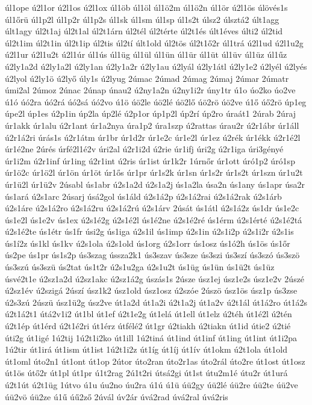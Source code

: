 {úl1ope
ú2l1or
ú2l1os
ú2l1ox
úl1öb
úl1öl
úl1ö2m
úl1ö2n
úl1ör
ú2l1ös
úlövés1s
úl1őrü
úl1p2l
úl1p2r
úl1p2s
úl1sk
úl1sm
úl1sp
úl1s2t
úlsz2
úlsztá2
últ1agg
últ1agy
úl2t1aj
úl2t1al
úl2t1árn
úl2tél
úl2térte
úl2t1és
últ1éves
últi2
úl2tid
úl2t1im
úl2t1in
úl2t1ip
úl2tis
úl2tí
últ1old
úl2tös
úl2t1ő2r
úl1trá
ú2l1ud
ú2l1u2g
ú2l1ur
ú2l1u2t
ú2l1úr
úl1ús
úl1üg
úl1ül
úl1ün
úl1ür
úl1üt
úl1üv
úl1üz
úl1űz
ú2ly1a2d
ú2ly1a2l
ú2ly1an
ú2ly1a2r
ú2ly1au
ú2lyál
ú2ly1átl
ú2ly1e2
ú2lyél
ú2lyés
ú2lyol
ú2ly1ö
ú2lyő
úly1s
ú2lyug
2úmac
2úmad
2úmag
2úmaj
2úmar
2úmatr
úmi2al
2úmoz
2únac
2únap
únau2
ú2ny1a2n
ú2ny1i2r
úny1tr
ú1o
úo2ko
úo2ve
ú1ó
úó2ra
úó2rá
úó2sá
úó2vo
ú1ö
úö2le
úö2lé
úö2lő
úö2rö
úö2ve
ú1ő
úő2rö
úp1eg
úpe2l
úp1es
ú2p1in
úp2la
úp2lé
ú2p1or
úp1p2l
úp2rí
úp2ro
úraát1
2úrab
2úraj
úr1akk
úr1alu
ú2r1ant
úr1a2nya
úra1p2
úra1szp
ú2rattas
úrau2r
ú2r1ábr
úr1áll
ú2r1á2ri
úrás1s
ú2r1átm
úr1br
úr1d2r
úr1e2c
úr1e2l
úr1ez
ú2rék
úr1ékk
ú2r1é2l
úr1é2ne
2úrés
úrfé2l1é2v
úri2al
ú2r1i2d
ú2rie
úr1ifj
úri2g
ú2r1iga
úri3gényé
úr1i2m
ú2r1inf
úr1ing
ú2r1int
ú2ris
úr1ist
úr1k2r
1úrnőr
úr1ott
úró1p2
úró1sp
úr1ö2c
úr1ö2l
úr1ön
úr1öt
úr1ős
úr1pr
úr1s2k
úr1sn
úr1s2r
úr1s2t
úr1szn
úr1u2t
úr1ü2l
úr1ü2v
2úsabl
ús1abr
ú2s1a2d
ú2s1a2j
ús1a2la
úsa2n
ús1any
ús1apr
úsa2r
ús1ará
ú2s1arc
2úsarj
úsá2gol
ús1áld
ú2s1á2p
ú2s1á2rai
ú2s1á2rak
ú2s1árb
ú2s1áre
ú2s1á2ro
ú2s1á2ru
ú2s1á2rú
ú2s1árv
2úsát
ús1átl
ú2s1á2z
ús1dr
ús1e2c
ús1e2l
ús1e2v
ús1ex
ú2s1é2g
ú2s1é2l
ús1é2ne
ú2s1é2ré
ús1érm
ú2s1érté
ú2s1é2tá
ú2s1é2te
ús1étr
ús1fr
úsi2g
ús1iga
ú2s1il
ús1imp
ú2s1in
ú2s1i2p
ú2s1i2r
ú2s1is
ús1í2z
ús1kl
ús1kv
ú2s1ola
ú2s1old
ús1org
ú2s1orr
ús1osz
ús1ó2h
ús1ös
ús1őr
ús2pe
ús1pr
ús1s2p
ús3szag
ússza2k1
ús3szav
ús3sze
ús3szi
ús3szí
ús3szó
ús3szö
ús3szú
ús3szü
ús2tat
ús1t2r
ú2s1u2ga
ú2s1u2t
ús1üg
ús1ün
ús1ü2t
ús1üz
úsvé2t1e
ú2sz1a2d
ú2sz1akc
ú2sz1á2g
úszás1s
2úsze
úsz1ej
úsz1e2s
úsz1e2v
2úszé
ú2sz1év
ú2szigá
2úszí
úsz1k2
úsz1old
úsz1osz
ú2szóe
2úszö
úsz1ös
úsz1p
ús3zse
ú2s3zú
2úszü
úsz1ü2g
úsz2ve
út1a2d
út1a2i
ú2t1a2j
út1a2v
ú2t1ál
út1á2ro
út1á2s
ú2t1á2t1
útá2v1i2
út1bl
út1ef
ú2t1e2g
út1elá
út1ell
út1elz
ú2téh
út1é2l
ú2tén
ú2t1ép
út1érd
ú2t1é2ri
út1érz
útfélé2
út1gr
ú2tiakh
ú2tiakn
út1id
útie2
ú2tié
úti2g
út1igé
1ú2tij
1ú2t1i2ko
út1ill
1ú2tiná
út1ind
út1inf
út1ing
út1int
út1i2pa
1ú2tir
út1irá
út1ism
út1ist
1ú2t1i2z
út1íg
út1íj
út1ív
út1okm
ú2t1ola
út1old
út1oml
úto2n1
út1ont
út1op
2útor
úto2ran
úto2r1as
úto2rál
úto2re
út1ost
út1osz
út1ös
útő2r
út1pl
út1pr
ú1t2rag
2ú1t2ri
útsá2gi
út1st
útu2m1é
útu2r
út1urá
ú2t1út
ú2t1üg
1útvo
ú1u
úu2no
úu2ra
ú1ú
ú1ü
úü2gy
úü2lé
úü2re
úü2te
úü2ve
úü2vö
úü2ze
ú1ű
úű2ző
2úvál
úv2ár
úvá2rad
úvá2ral
úvá2ris
}
